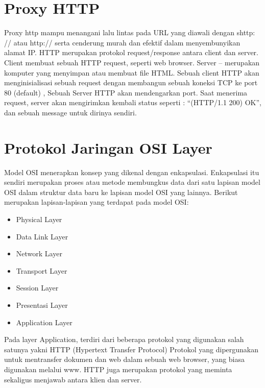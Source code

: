 \section{Proxy HTTP}
Proxy http mampu menangani lalu lintas pada URL yang diawali dengan shttp: // atau http:// serta cenderung murah dan efektif dalam menyembunyikan alamat IP. HTTP merupakan protokol request/response antara client dan server. Client membuat sebuah HTTP request, seperti web browser. Server – merupakan komputer yang menyimpan atau membuat file HTML. Sebuah client HTTP akan menginisialisasi sebuah request dengan membangun sebuah koneksi TCP ke port 80 (default) , Sebuah Server HTTP akan mendengarkan port. Saat menerima request, server akan mengirimkan kembali status seperti : “(HTTP/1.1 200) OK”, dan sebuah message untuk dirinya sendiri\cite{farhanah2011pengembangan}.

\section{Protokol Jaringan OSI Layer}
Model OSI menerapkan konsep yang dikenal dengan enkapsulasi. Enkapsulasi itu sendiri merupakan proses atau metode membungkus data dari satu lapisan model OSI dalam struktur data baru ke lapisan model OSI yang lainnya. Berikut merupakan lapisan-lapisan yang terdapat pada model OSI:
\begin{itemize}
\item Physical Layer
\item Data Link Layer
\item Network Layer
\item Transport Layer
\item Session Layer
\item Presentasi Layer
\item Application Layer
\end{itemize}
Pada layer Application, terdiri dari beberapa protokol yang digunakan salah satunya yakni HTTP (Hypertext Transfer Protocol) Protokol yang dipergunakan untuk mentransfer dokumen dan web dalam sebuah web browser, yang biasa digunakan melalui www. HTTP juga merupakan protokol yang meminta sekaligus menjawab antara klien dan server\cite{sujana2015perangkat}.

